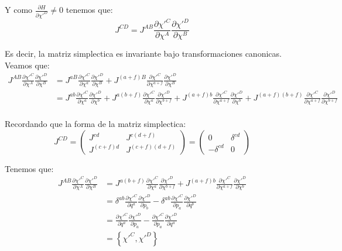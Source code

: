 \documentclass[12pt]{report}
\begin{document}
Y como $\frac{\partial H}{\partial \chi'^{D}}  \neq 0$ tenemos que:
	\begin{equation*}
		J^{CD} = J^{AB}\frac{\partial \chi'^{C}}{\partial \chi^{A}}\frac{\partial \chi'^{D}}{\partial \chi^{B}} 
	\end{equation*}

Es decir, la matriz simplectica es invariante bajo transformaciones canonicas. \\

Veamos que:
	\begin{align*}
		J^{AB}\frac{\partial \chi'^{C}}{\partial \chi^{A}}\frac{\partial \chi'^{D}}{\partial \chi^{B}} 
	 &= J^{aB}\frac{\partial \chi'^{C}}{\partial \chi^{a}}\frac{\partial \chi'^{D}}{\partial \chi^{B}} 
	   +J^{\left(a+f\right)B}\frac{\partial \chi'^{C}}{\partial \chi^{a+f}}\frac{\partial \chi'^{D}}{\partial \chi^{B}} \\
	 &= J^{ab}\frac{\partial \chi'^{C}}{\partial \chi^{a}}\frac{\partial \chi'^{D}}{\partial \chi^{b}} 
	   +J^{a\left(b+f\right)}\frac{\partial \chi'^{C}}{\partial \chi^{a}}\frac{\partial \chi'^{D}}{\partial \chi^{b+f}} 
	   +J^{\left(a+f\right)b}\frac{\partial \chi'^{C}}{\partial \chi^{a+f}}\frac{\partial \chi'^{D}}{\partial \chi^{b}} 
	   +J^{\left(a+f\right)\left(b+f\right)}\frac{\partial \chi'^{C}}{\partial \chi^{a+f}}\frac{\partial \chi'^{D}}{\partial \chi^{b+f}} \\
	\end{align*}
	
Recordando que la forma de la matriz simplectica:
	\begin{equation*}
		J^{CD} = \begin{pmatrix} J^{cd} & J^{c\left(d+f\right)} \\
								 J^{\left(c+f\right) d} & J^{\left(c+f\right) \left(d+f\right)} \end{pmatrix}
		= \begin{pmatrix} 0 & \delta^{cd} \\
								 -\delta^{cd} & 0 \end{pmatrix}
	\end{equation*}

Tenemos que:
	\begin{align*}
		J^{AB}\frac{\partial \chi'^{C}}{\partial \chi^{A}}\frac{\partial \chi'^{D}}{\partial \chi^{B}} 
	 &= J^{a\left(b+f\right)}\frac{\partial \chi'^{C}}{\partial \chi^{a}}\frac{\partial \chi'^{D}}{\partial \chi^{b+f}} 
	   +J^{\left(a+f\right)b}\frac{\partial \chi'^{C}}{\partial \chi^{a+f}}\frac{\partial \chi'^{D}}{\partial \chi^{b}} \\
	 &= \delta^{ab}\frac{\partial \chi'^{C}}{\partial q^{a}}\frac{\partial \chi'^{D}}{\partial p_{b}}
	   -\delta^{ab}\frac{\partial \chi'^{C}}{\partial p_{a}}\frac{\partial \chi'^{D}}{\partial q^{b}} \\
	 &= \frac{\partial \chi'^{C}}{\partial q^{a}}\frac{\partial \chi'^{D}}{\partial p_{a}}
	   -\frac{\partial \chi'^{C}}{\partial p_{a}}\frac{\partial \chi'^{D}}{\partial q^{a}} \\	   
	 &= \left\{ \chi'^{C}, \chi'^{D}  \right\}	 
	\end{align*}	 
\end{document}
